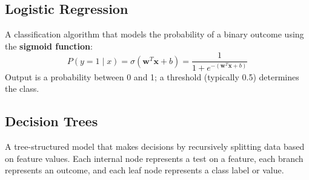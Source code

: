 \documentclass[11pt,a4paper]{article}
\begin{document}
\subsection{Logistic Regression}

\begin{definitionbox}
A classification algorithm that models the probability of a binary outcome using the \textbf{sigmoid function}:
$$P(y=1 \mid x) = \sigma(\mathbf{w}^T\mathbf{x} + b) = \frac{1}{1 + e^{-(\mathbf{w}^T\mathbf{x} + b)}}$$
Output is a probability between 0 and 1; a threshold (typically 0.5) determines the class.
\end{definitionbox}

\begin{center}
\end{center}

\subsection{Decision Trees}

\begin{definitionbox}
A tree-structured model that makes decisions by recursively splitting data based on feature values. Each internal node represents a test on a feature, each branch represents an outcome, and each leaf node represents a class label or value.
\end{definitionbox}
\end{document}
